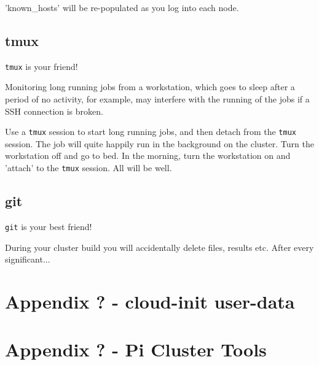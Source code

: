 \documentclass{article}
\begin{document}
'known\_hosts' will be re-populated as you log into each node. 

\subsection{tmux}
\verb|tmux| is your friend!

Monitoring long running jobs from a workstation, which goes to sleep after a period of no activity, for example, may interfere with the running of the jobs if a SSH connection is broken.

Use a \verb|tmux| session to start long running jobs, and then detach from the \verb|tmux| session. The job will quite happily run in the background on the cluster. Turn the workstation off and go to bed. In the morning, turn the workstation on and 'attach' to the \verb|tmux| session. All will be well.

\subsection{git}
\verb|git| is your best friend!

During your cluster build you will accidentally delete files, results etc. After every significant...



%
%
\clearpage\section*{Appendix ? - cloud-init user-data}





%
%
\clearpage\section*{Appendix ? - Pi Cluster Tools}









%
\end{document}
